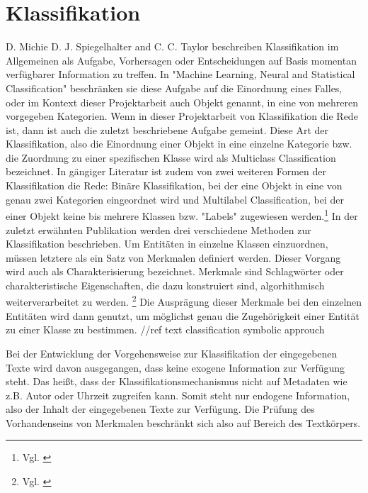 \section{Klassifikation}
D. Michie  D. J. Spiegelhalter  and C. C. Taylor beschreiben Klassifikation im Allgemeinen als Aufgabe, Vorhersagen oder Entscheidungen auf Basis momentan verfügbarer Information zu treffen. In "Machine Learning, Neural and Statistical Classification" beschränken sie diese Aufgabe auf die Einordnung eines Falles, oder im Kontext dieser Projektarbeit auch Objekt genannt, in eine von mehreren vorgegeben Kategorien. Wenn in dieser Projektarbeit von Klassifikation die Rede ist, dann ist auch die zuletzt beschriebene Aufgabe gemeint. Diese Art der Klassifikation, also die Einordnung einer Objekt in eine einzelne Kategorie bzw. die Zuordnung zu einer spezifischen Klasse wird als Multiclass Classification bezeichnet. In gängiger Literatur ist zudem von zwei weiteren Formen der Klassifikation die Rede: Binäre Klassifikation, bei der eine Objekt in eine von genau zwei Kategorien eingeordnet wird und Multilabel Classification, bei der einer Objekt keine bis mehrere Klassen bzw. "Labels" zugewiesen werden.\footnote{Vgl. \cite{michie1994machine}}
In der zuletzt erwähnten Publikation werden drei verschiedene Methoden zur Klassifikation beschrieben.
Um Entitäten in einzelne Klassen einzuordnen, müssen letztere als ein Satz von Merkmalen definiert werden. Dieser Vorgang wird auch als Charakterisierung bezeichnet. Merkmale sind Schlagwörter oder charakteristische Eigenschaften, die dazu konstruiert sind, algorhithmisch weiterverarbeitet zu werden. \footnote{Vgl. \cite{nadeau2007survey}} Die Ausprägung dieser Merkmale bei den einzelnen Entitäten wird dann genutzt, um möglichst genau die Zugehörigkeit einer Entität zu einer Klasse zu bestimmen. //ref text classification symbolic approuch

Bei der Entwicklung der Vorgehensweise zur Klassifikation der eingegebenen Texte wird davon ausgegangen, dass keine exogene Information zur Verfügung steht. Das heißt, dass der Klassifikationsmechanismus nicht auf Metadaten wie z.B. Autor oder Uhrzeit zugreifen kann. Somit steht nur endogene Information, also der Inhalt der eingegebenen Texte zur Verfügung. Die Prüfung des Vorhandenseins von Merkmalen beschränkt sich also auf Bereich des Textkörpers. \cite{sebastiano}

